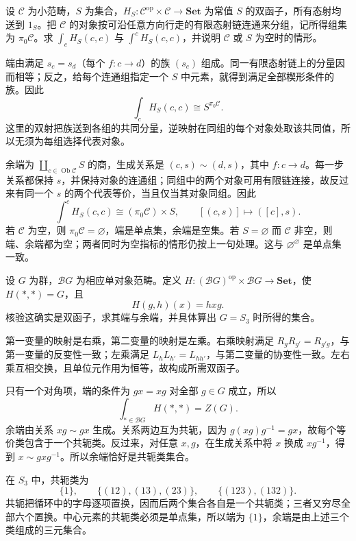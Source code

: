\begin{optionalexercise}\label{b4:ex:03-constant-ends-components}
	设 \(\mathcal C\) 为小范畴，\(S\) 为集合，\(H_S:\mathcal C^{\mathrm{op}}\times\mathcal C\rightarrow\mathbf{Set}\) 为常值 \(S\) 的双函子，所有态射均送到 \(1_S\)。把 \(\mathcal C\) 的对象按可沿任意方向行走的有限态射链连通来分组，记所得组集为 \(\pi_0\mathcal C\)。求 \(\int_cH_S(c,c)\) 与 \(\int^cH_S(c,c)\)，并说明 \(\mathcal C\) 或 \(S\) 为空时的情形。
\end{optionalexercise}
\begin{solution}
	端由满足 \(s_c=s_d\)（每个 \(f:c\rightarrow d\)）的族 \((s_c)\) 组成。同一有限态射链上的分量因而相等；反之，给每个连通组指定一个 \(S\) 中元素，就得到满足全部楔形条件的族。因此
	\[
		\int_cH_S(c,c)\cong S^{\pi_0\mathcal C}.
	\]
	这里的双射把族送到各组的共同分量，逆映射在同组的每个对象处取该共同值，所以无须为每组选择代表对象。

	余端为 \(\coprod_{c\in\operatorname{Ob}\mathcal C}S\) 的商，生成关系是 \((c,s)\sim(d,s)\)，其中 \(f:c\rightarrow d\)。每一步关系都保持 \(s\)，并保持对象的连通组；同组中的两个对象可用有限链连接，故反过来有同一个 \(s\) 的两个代表等价，当且仅当其对象同组。因此
	\[
		\int^cH_S(c,c)\cong(\pi_0\mathcal C)\times S,
		\qquad [(c,s)]\longmapsto([c],s).
	\]
	若 \(\mathcal C\) 为空，则 \(\pi_0\mathcal C=\varnothing\)，端是单点集，余端是空集。若 \(S=\varnothing\) 而 \(\mathcal C\) 非空，则端、余端都为空；两者同时为空指标的情形仍按上一句处理。这与 \(\varnothing^{\varnothing}\) 是单点集一致。
\end{solution}

\begin{optionalexercise}\label{b4:ex:03-group-end-conjugacy}
	设 \(G\) 为群，\(\mathcal BG\) 为相应单对象范畴。定义 \(H:(\mathcal BG)^{\mathrm{op}}\times\mathcal BG\rightarrow\mathbf{Set}\)，使 \(H(*,*)=G\)，且
	\[
		H(g,h)(x)=hxg.
	\]
	核验这确实是双函子，求其端与余端，并具体算出 \(G=S_3\) 时所得的集合。
\end{optionalexercise}
\begin{solution}
	第一变量的映射是右乘，第二变量的映射是左乘。右乘映射满足 \(R_gR_{g'}=R_{g'g}\)，与第一变量的反变性一致；左乘满足 \(L_hL_{h'}=L_{hh'}\)，与第二变量的协变性一致。左右乘互相交换，且单位元作用为恒等，故构成所需双函子。

	只有一个对角项，端的条件为 \(gx=xg\) 对全部 \(g\in G\) 成立，所以
	\[
		\int_{*\in\mathcal BG}H(*,*)=Z(G).
	\]
	余端由关系 \(xg\sim gx\) 生成。关系两边互为共轭，因为 \(g(xg)g^{-1}=gx\)，故每个等价类包含于一个共轭类。反过来，对任意 \(x,g\)，在生成关系中将 \(x\) 换成 \(xg^{-1}\)，得到 \(x\sim gxg^{-1}\)。所以余端恰好是共轭类集合。

	在 \(S_3\) 中，共轭类为
	\[
		\{1\},\qquad
		\{(12),(13),(23)\},\qquad
		\{(123),(132)\}.
	\]
	共轭把循环中的字母逐项置换，因而后两个集合各自是一个共轭类；三者又穷尽全部六个置换。中心元素的共轭类必须是单点集，所以端为 \(\{1\}\)，余端是由上述三个类组成的三元集合。
\end{solution}

